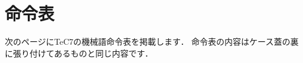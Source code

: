 \renewcommand{\myincludegraphics}[2]{\texttt{[image: appC/\#1]}}

\newpage
\onecolumn
\chapter{命令表}
\label{appC}

次のページにTeC7の機械語命令表を掲載します．
命令表の内容はケース蓋の裏に張り付けてあるものと同じ内容です．

